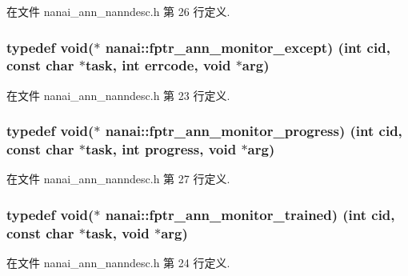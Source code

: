 在文件 nanai\+\_\+ann\+\_\+nanndesc.\+h 第 26 行定义.

\hypertarget{namespacenanai_ad9527fac6e647a6c149e4f9a8681e4c1}{}
\subsubsection[{fptr\+\_\+ann\+\_\+monitor\+\_\+except}]{\setlength{\rightskip}{0pt plus 5cm}typedef void($\ast$ nanai\+::fptr\+\_\+ann\+\_\+monitor\+\_\+except) (int cid, const char $\ast$task, int {\bf errcode}, void $\ast$arg)}\label{namespacenanai_ad9527fac6e647a6c149e4f9a8681e4c1}


在文件 nanai\+\_\+ann\+\_\+nanndesc.\+h 第 23 行定义.

\hypertarget{namespacenanai_a5c9964edbd4db8ae35df7cd024020e87}{}
\subsubsection[{fptr\+\_\+ann\+\_\+monitor\+\_\+progress}]{\setlength{\rightskip}{0pt plus 5cm}typedef void($\ast$ nanai\+::fptr\+\_\+ann\+\_\+monitor\+\_\+progress) (int cid, const char $\ast$task, int progress, void $\ast$arg)}\label{namespacenanai_a5c9964edbd4db8ae35df7cd024020e87}


在文件 nanai\+\_\+ann\+\_\+nanndesc.\+h 第 27 行定义.

\hypertarget{namespacenanai_adb209ab120b98e800db2b0c8621cd488}{}
\subsubsection[{fptr\+\_\+ann\+\_\+monitor\+\_\+trained}]{\setlength{\rightskip}{0pt plus 5cm}typedef void($\ast$ nanai\+::fptr\+\_\+ann\+\_\+monitor\+\_\+trained) (int cid, const char $\ast$task, void $\ast$arg)}\label{namespacenanai_adb209ab120b98e800db2b0c8621cd488}


在文件 nanai\+\_\+ann\+\_\+nanndesc.\+h 第 24 行定义.

